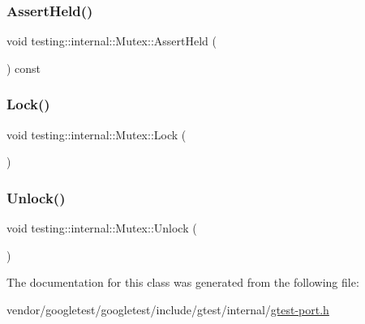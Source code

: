 \subsubsection{\texorpdfstring{Assert\+Held()}{AssertHeld()}}
{\footnotesize\ttfamily void testing\+::internal\+::\+Mutex\+::\+Assert\+Held (\begin{DoxyParamCaption}{ }\end{DoxyParamCaption}) const\hspace{0.3cm}{\ttfamily [inline]}}

\mbox{\label{classtesting_1_1internal_1_1_mutex_ae7e2191886c00182176b23c4f4d049f8}} 
\subsubsection{\texorpdfstring{Lock()}{Lock()}}
{\footnotesize\ttfamily void testing\+::internal\+::\+Mutex\+::\+Lock (\begin{DoxyParamCaption}{ }\end{DoxyParamCaption})\hspace{0.3cm}{\ttfamily [inline]}}

\mbox{\label{classtesting_1_1internal_1_1_mutex_a315188055de1be98884519ad84eff2e6}} 
\subsubsection{\texorpdfstring{Unlock()}{Unlock()}}
{\footnotesize\ttfamily void testing\+::internal\+::\+Mutex\+::\+Unlock (\begin{DoxyParamCaption}{ }\end{DoxyParamCaption})\hspace{0.3cm}{\ttfamily [inline]}}



The documentation for this class was generated from the following file\+:\begin{DoxyCompactItemize}
\item 
vendor/googletest/googletest/include/gtest/internal/\hyperlink{gtest-port_8h}{gtest-\/port.\+h}\end{DoxyCompactItemize}
